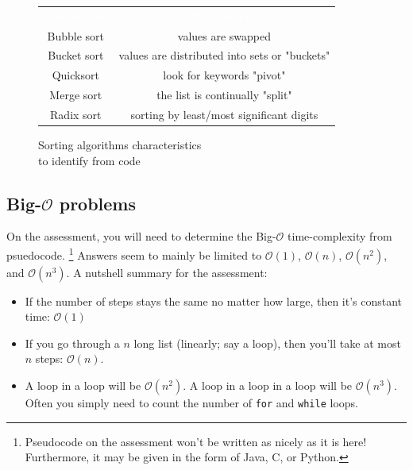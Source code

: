\documentclass{exam}
\begin{document}
\begin{figure}
    \begin{myThm}
        \centering
            \begin{tabular}{cc}
                \rowcolor{blueWGU!50}
                \textcolor{white}{Sort function} & \textcolor{white}{Characteristic}\\
                Bubble sort & values are swapped\\
                Bucket sort & values are distributed into sets or "buckets"\\
                Quicksort & look for keywords "pivot"\\
                Merge sort & the list is continually "split"\\
                Radix sort & sorting by least/most significant digits
            \end{tabular}
        \caption*{Sorting algorithms characteristics \\to identify from code}
    \end{myThm}
\end{figure}



\newpage
\subsection*{Big-$\mathcal{O}$ problems}

\begin{myThm}
    On the assessment, you will need to determine the Big-$\mathcal{O}$ time-complexity from psuedocode. \footnote{Pseudocode on the assessment won't be written as nicely as it is here! Furthermore, it may be given in the form of Java, C, or Python.} Answers seem to mainly be limited to $\mathcal{O}(1)$, $\mathcal{O}(n)$, $\mathcal{O}(n^{2})$, and $\mathcal{O}(n^3)$. A nutshell summary for the assessment:
    \begin{itemize}
        \item If the number of steps stays the same no matter how large, then it’s constant time: $\mathcal{O}(1)$
        \item If you go through a $n$ long list (linearly; say a loop), then you’ll take at most $n$ steps: $\mathcal{O}(n)$.
        \item A loop in a loop will be $\mathcal{O}(n^{2})$. A loop in a loop in a loop will be $\mathcal{O}(n^{3})$. Often you simply need to count the number of \texttt{for} and \texttt{while} loops.
    \end{itemize}
\end{myThm}
\end{document}

